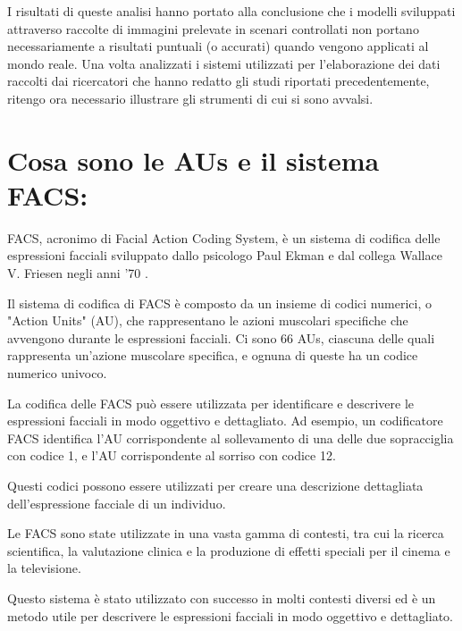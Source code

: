 I risultati di queste analisi hanno portato alla conclusione che i modelli sviluppati attraverso raccolte di immagini prelevate in scenari controllati non portano necessariamente a risultati puntuali (o accurati) quando vengono applicati al mondo reale.
Una volta analizzati i sistemi utilizzati per l’elaborazione dei dati raccolti dai ricercatori che hanno redatto gli studi riportati precedentemente, ritengo ora necessario illustrare gli strumenti di cui si sono avvalsi.


\section{Cosa sono le AUs e il sistema FACS:}
FACS, acronimo di Facial Action Coding System, è un sistema di codifica delle espressioni facciali sviluppato dallo psicologo Paul Ekman e dal collega Wallace V. Friesen negli anni '70 \cite{PyFeat}.

Il sistema di codifica di FACS è composto da un insieme di codici numerici, o "Action Units" (AU), che rappresentano le azioni muscolari specifiche che avvengono durante le espressioni facciali. Ci sono 66 AUs, ciascuna delle quali rappresenta un'azione muscolare specifica, e ognuna di queste ha un codice numerico univoco.

La codifica delle FACS può essere utilizzata per identificare e descrivere le espressioni facciali in modo oggettivo e dettagliato. Ad esempio, un codificatore FACS identifica l'AU corrispondente al sollevamento di una delle due sopracciglia con codice 1, e l'AU corrispondente al sorriso con codice 12. 

Questi codici possono essere utilizzati per creare una descrizione dettagliata dell'espressione facciale di un individuo.

Le FACS sono state utilizzate in una vasta gamma di contesti, tra cui la ricerca scientifica, la valutazione clinica e la produzione di effetti speciali per il cinema e la televisione. 

Questo sistema è stato utilizzato con successo in molti contesti diversi ed è un metodo utile per descrivere le espressioni facciali in modo oggettivo e dettagliato. 

